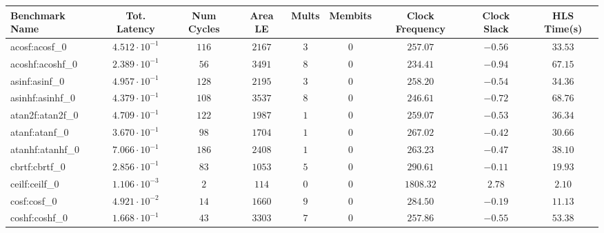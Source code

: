 \begin{tabular}{|l|c|c|c|c|c|c|c|c|}
\hline
Benchmark Name               & Tot. Latency            & Num Cycles & Area LE   & Mults   & Membits & Clock Frequency & Clock Slack & HLS Time(s) \\
\hline
acosf:acosf\_0               & $ 4.512 \cdot 10^{-1} $ & $ 116    $ & $ 2167  $ & $ 3   $ & $ 0   $ & $ 257.07      $ & $ -0.56   $ & $ 33.53   $ \\
acoshf:acoshf\_0             & $ 2.389 \cdot 10^{-1} $ & $ 56     $ & $ 3491  $ & $ 8   $ & $ 0   $ & $ 234.41      $ & $ -0.94   $ & $ 67.15   $ \\
asinf:asinf\_0               & $ 4.957 \cdot 10^{-1} $ & $ 128    $ & $ 2195  $ & $ 3   $ & $ 0   $ & $ 258.20      $ & $ -0.54   $ & $ 34.36   $ \\
asinhf:asinhf\_0             & $ 4.379 \cdot 10^{-1} $ & $ 108    $ & $ 3537  $ & $ 8   $ & $ 0   $ & $ 246.61      $ & $ -0.72   $ & $ 68.76   $ \\
atan2f:atan2f\_0             & $ 4.709 \cdot 10^{-1} $ & $ 122    $ & $ 1987  $ & $ 1   $ & $ 0   $ & $ 259.07      $ & $ -0.53   $ & $ 36.34   $ \\
atanf:atanf\_0               & $ 3.670 \cdot 10^{-1} $ & $ 98     $ & $ 1704  $ & $ 1   $ & $ 0   $ & $ 267.02      $ & $ -0.42   $ & $ 30.66   $ \\
atanhf:atanhf\_0             & $ 7.066 \cdot 10^{-1} $ & $ 186    $ & $ 2408  $ & $ 1   $ & $ 0   $ & $ 263.23      $ & $ -0.47   $ & $ 38.10   $ \\
cbrtf:cbrtf\_0               & $ 2.856 \cdot 10^{-1} $ & $ 83     $ & $ 1053  $ & $ 5   $ & $ 0   $ & $ 290.61      $ & $ -0.11   $ & $ 19.93   $ \\
ceilf:ceilf\_0               & $ 1.106 \cdot 10^{-3} $ & $ 2      $ & $ 114   $ & $ 0   $ & $ 0   $ & $ 1808.32     $ & $ 2.78    $ & $ 2.10    $ \\
cosf:cosf\_0                 & $ 4.921 \cdot 10^{-2} $ & $ 14     $ & $ 1660  $ & $ 9   $ & $ 0   $ & $ 284.50      $ & $ -0.19   $ & $ 11.13   $ \\
coshf:coshf\_0               & $ 1.668 \cdot 10^{-1} $ & $ 43     $ & $ 3303  $ & $ 7   $ & $ 0   $ & $ 257.86      $ & $ -0.55   $ & $ 53.38   $ \\

\end{tabular}
